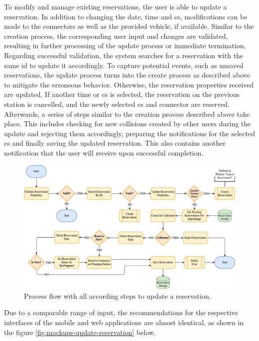 To modify and manage existing reservations, the user is able to update a reservation. In addition to changing the date, time and \acrshort{cs}, modifications can be made to the connectors as well as the provided vehicle, if available. 
Similar to the creation process, the corresponding user input and changes are validated, resulting in further processing of the update process or immediate termination.
Regarding successful validation, the system searches for a reservation with the same \acrshort{id} to update it accordingly.
To capture potential events, such as unsaved reservations, the update process turns into the create process as described above to mitigate the erroneous behavior.
Otherwise, the reservation properties received are updated. If another time or \acrshort{cs} is selected, the reservation on the previous station is cancelled, and the newly selected \acrshort{cs} and connector are reserved.
Afterwards, a series of steps similar to the creation process described above take place. This includes checking for new collisions created by other users during the update and rejecting them accordingly, preparing the notifications for the selected \acrshort{cs} and finally saving the updated reservation.
This also contains another notification that the user will receive upon successful completion.

\begin{figure}[h]
    \centering
    \includegraphics[scale=0.4]{resources/images/main/5_design/processes/ReservationUpdate.png}
    \caption{Process flow with all according steps to update a reservation.}
    \label{fig:update-reservation-flowchart}
\end{figure}

\noindent Due to a comparable range of input, the recommendations for the respective interfaces of the mobile and web applications are almost identical, as shown in the figure \ref{fig:mockups-update-reservation} below.

